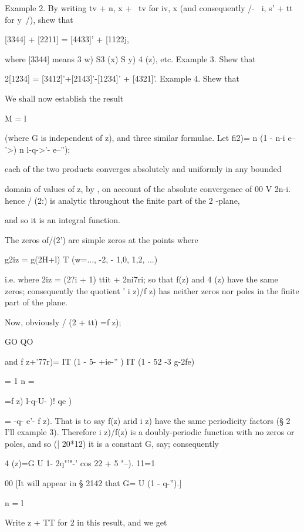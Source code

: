 %
%

Example 2. By writing tv + n, x + \ tv for iv, x (and consequently /-
\ i, s' + tt for y\ /), shew that

[3344] + [2211] = [4433]' + [1122j,

where [3344] means 3 w) S3 (x) S y) 4 (z), etc. Example 3. Shew that

2[1234] = [3412]'+[2143]'-[1234]' + [4321]'. Example 4. Shew that

We shall now establish the result

M = l

(where G is independent of z), and three similar formulae. Let fi2)= n
(1 - n-i e-- '>) n l-q->'- e--'');

each of the two products converges absolutely and uniformly in any
bounded

domain of values of z, by , on account of the absolute
convergence of 00 V 2n-i. hence / (2:) is analytic throughout the
finite part of the 2 -plane,

and so it is an integral function.

The zeros of/(2') are simple zeros at the points where

g2iz = g(2H+l) T (w=..., -2, - 1,0, 1,2, ...)

i.e. where 2iz = (2?i + 1) ttit + 2ni7ri; so that f(z) and 4 (z) have
the same zeros; consequently the quotient ' i z)/f z) has neither
zeros nor poles in the finite part of the plane.

Now, obviously / (2 + tt) =f z);

GO QO

and f z+'77r)= IT (1 - 5- +ie-'' ) IT (1 - 52 -3 g-2fe)

  = 1 n = \

=f z) l-q-U- )! qe )

= -q- e'- f z). That is to say f(z) arid i z) have the same
periodicity factors (§ 2 I'll example 3). Therefore i z)/f(z) is a
doubly-periodic function with no zeros or poles, and so (| 20*12) it
is a constant G, say; consequently

 4 (z)=G U 1- 2q"'"-' cos 22 + 5 "--). 11=1

00 [It will appear in § 2142 that G= U (1 - q-'').]

n = l

Write z + TT for 2 in this result, and we get


